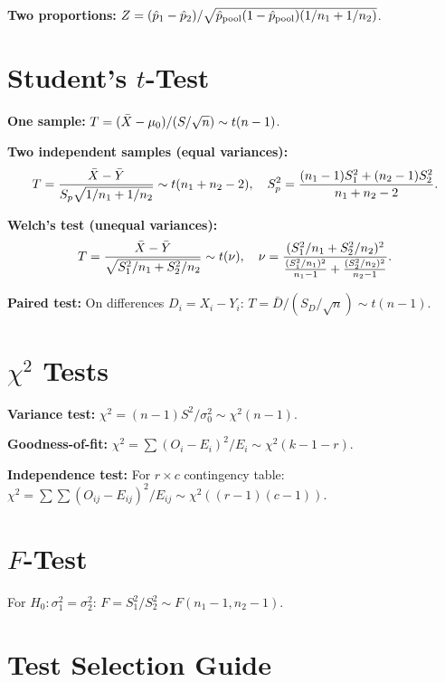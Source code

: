 \textbf{Two proportions:} $Z = (\hat{p}_1-\hat{p}_2)/\sqrt{\hat{p}_{\mathrm{pool}}(1-\hat{p}_{\mathrm{pool}})(1/n_1+1/n_2)}$.

\section{Student's $t$-Test}

\textbf{One sample:} $T = (\bar{X}-\mu_0)/(S/\sqrt{n}) \sim t(n-1)$.

\textbf{Two independent samples (equal variances):}
\[
T = \frac{\bar{X}-\bar{Y}}{S_p\sqrt{1/n_1+1/n_2}} \sim t(n_1+n_2-2), \quad S_p^2=\frac{(n_1-1)S_1^2+(n_2-1)S_2^2}{n_1+n_2-2}.
\]

\textbf{Welch's test (unequal variances):}
\[
T = \frac{\bar{X}-\bar{Y}}{\sqrt{S_1^2/n_1+S_2^2/n_2}} \sim t(\nu), \quad \nu = \frac{(S_1^2/n_1+S_2^2/n_2)^2}{\frac{(S_1^2/n_1)^2}{n_1-1}+\frac{(S_2^2/n_2)^2}{n_2-1}}.
\]

\textbf{Paired test:} On differences $D_i=X_i-Y_i$: $T=\bar{D}/(S_D/\sqrt{n})\sim t(n-1)$.

\section{$\chi^2$ Tests}

\textbf{Variance test:} $\chi^2 = (n-1)S^2/\sigma_0^2 \sim \chi^2(n-1)$.

\textbf{Goodness-of-fit:} $\chi^2 = \sum (O_i-E_i)^2/E_i \sim \chi^2(k-1-r)$.

\textbf{Independence test:} For $r\times c$ contingency table: $\chi^2 = \sum\sum(O_{ij}-E_{ij})^2/E_{ij} \sim \chi^2((r-1)(c-1))$.

\section{$F$-Test}

For $H_0:\sigma_1^2=\sigma_2^2$: $F = S_1^2/S_2^2 \sim F(n_1-1,n_2-1)$.

\section{Test Selection Guide}

